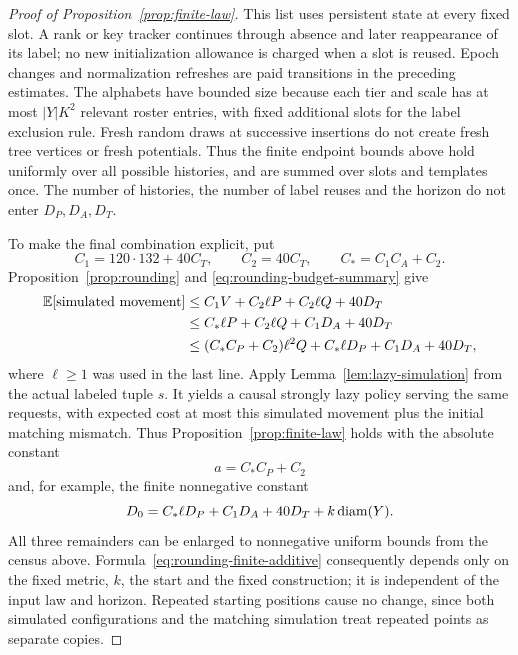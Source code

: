 \begin{proof}[Proof of Proposition~\ref{prop:finite-law}]
This list uses persistent state at every fixed slot.  A rank or key tracker
continues through absence and later reappearance of its label; no new
initialization allowance is charged when a slot is reused.  Epoch changes
and normalization refreshes are paid transitions in the preceding
estimates.  The alphabets have bounded size because each tier and scale
has at most $|Y|K^2$ relevant roster entries, with fixed additional slots
for the label exclusion rule.  Fresh random draws at successive insertions
do not create fresh tree vertices or fresh potentials.  Thus the finite
endpoint bounds above hold uniformly over all possible histories, and
are summed over slots and templates once.  The number of histories, the
number of label reuses and the horizon do not enter $D_P,D_A,D_T$.

To make the final combination explicit, put
\[
 C_1=120\cdot132+40C_T,
 \qquad C_2=40C_T,
 \qquad C_*=C_1C_A+C_2.
\]
Proposition~\ref{prop:rounding} and \eqref{eq:rounding-budget-summary} give
\begin{align*}
 \mathbb E[\text{simulated movement}]
 &\le C_1V+C_2\ell P+C_2\ell Q+40D_T\\
 &\le C_*\ell P+C_2\ell Q+C_1D_A+40D_T\\
 &\le (C_*C_P+C_2)\ell^2Q
                +C_*\ell D_P+C_1D_A+40D_T,
\end{align*}
where $\ell\ge1$ was used in the last line.  Apply
Lemma~\ref{lem:lazy-simulation} from the actual labeled tuple $s$.
It yields a causal strongly lazy policy serving the same requests, with
expected cost at most this simulated movement plus the initial matching
mismatch.  Thus Proposition~\ref{prop:finite-law} holds with the absolute
constant
\[
                  a=C_*C_P+C_2
\]
and, for example, the finite nonnegative constant
\begin{equation}\label{eq:rounding-finite-additive}
 D_0=C_*\ell D_P+C_1D_A+40D_T+k\operatorname{diam}(Y).
\end{equation}
All three remainders can be enlarged to nonnegative uniform bounds from the
census above.  Formula~\eqref{eq:rounding-finite-additive} consequently
depends only on the fixed metric, $k$, the start and the fixed construction;
it is independent of the input law and horizon.  Repeated starting
positions cause no change, since both simulated configurations and the
matching simulation treat repeated points as separate copies.
\end{proof}
